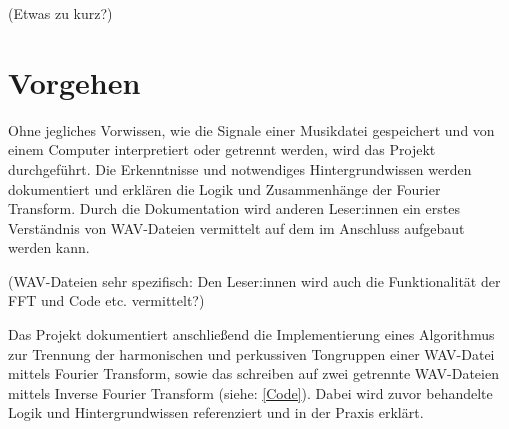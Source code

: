 \par


(Etwas zu kurz?)

%
\section{Vorgehen}
%

Ohne jegliches Vorwissen, wie die Signale einer Musikdatei gespeichert und von einem Computer interpretiert oder getrennt werden, wird das Projekt durchgeführt. Die Erkenntnisse und notwendiges Hintergrundwissen werden dokumentiert und erklären die Logik und Zusammenhänge der Fourier Transform. Durch die Dokumentation wird anderen Leser:innen ein erstes Verständnis von WAV-Dateien vermittelt auf dem im Anschluss aufgebaut werden kann.

\par

(WAV-Dateien sehr spezifisch: Den Leser:innen wird auch die Funktionalität der FFT und Code etc. vermittelt?)

\par

Das Projekt dokumentiert anschließend die Implementierung eines Algorithmus zur Trennung der harmonischen und perkussiven Tongruppen einer WAV-Datei mittels Fourier Transform, sowie das schreiben auf zwei getrennte WAV-Dateien mittels Inverse Fourier Transform (siehe: \cref{Code}). Dabei wird zuvor behandelte Logik und Hintergrundwissen referenziert und in der Praxis erklärt.